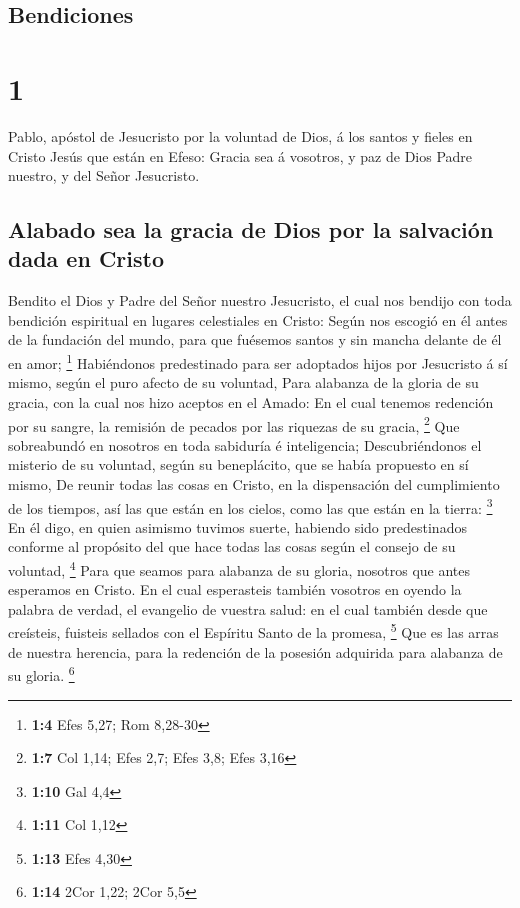 \hypertarget{bendiciones}{%
\subsection{Bendiciones}\label{bendiciones}}

\hypertarget{section}{%
\section{1}\label{section}}

 Pablo, apóstol de Jesucristo por la voluntad de Dios, á
los santos y fieles en Cristo Jesús que están en Efeso: 
Gracia sea á vosotros, y paz de Dios Padre nuestro, y del Señor
Jesucristo.

\hypertarget{alabado-sea-la-gracia-de-dios-por-la-salvaciuxf3n-dada-en-cristo}{%
\subsection{Alabado sea la gracia de Dios por la salvación dada en
Cristo}\label{alabado-sea-la-gracia-de-dios-por-la-salvaciuxf3n-dada-en-cristo}}

 Bendito el Dios y Padre del Señor nuestro Jesucristo, el
cual nos bendijo con toda bendición espiritual en lugares celestiales en
Cristo:  Según nos escogió en él antes de la fundación del
mundo, para que fuésemos santos y sin mancha delante de él en amor;
\footnote{\textbf{1:4} Efes 5,27; Rom 8,28-30} 
Habiéndonos predestinado para ser adoptados hijos por Jesucristo á sí
mismo, según el puro afecto de su voluntad,  Para alabanza
de la gloria de su gracia, con la cual nos hizo aceptos en el Amado:
 En el cual tenemos redención por su sangre, la remisión
de pecados por las riquezas de su gracia, \footnote{\textbf{1:7} Col
  1,14; Efes 2,7; Efes 3,8; Efes 3,16}  Que sobreabundó en
nosotros en toda sabiduría é inteligencia; 
Descubriéndonos el misterio de su voluntad, según su beneplácito, que se
había propuesto en sí mismo,  De reunir todas las cosas
en Cristo, en la dispensación del cumplimiento de los tiempos, así las
que están en los cielos, como las que están en la tierra: \footnote{\textbf{1:10}
  Gal 4,4}  En él digo, en quien asimismo tuvimos suerte,
habiendo sido predestinados conforme al propósito del que hace todas las
cosas según el consejo de su voluntad, \footnote{\textbf{1:11} Col 1,12}
 Para que seamos para alabanza de su gloria, nosotros que
antes esperamos en Cristo.  En el cual esperasteis
también vosotros en oyendo la palabra de verdad, el evangelio de vuestra
salud: en el cual también desde que creísteis, fuisteis sellados con el
Espíritu Santo de la promesa, \footnote{\textbf{1:13} Efes 4,30}
 Que es las arras de nuestra herencia, para la redención
de la posesión adquirida para alabanza de su gloria. \footnote{\textbf{1:14}
  2Cor 1,22; 2Cor 5,5}

